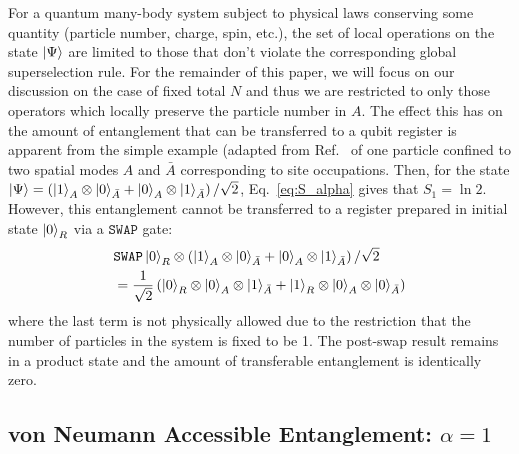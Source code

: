 For a quantum many-body system subject to physical laws conserving some quantity (particle number, charge, spin, etc.), the set of local operations on the state $\ket{\Psi}$ are limited to those that don't violate the corresponding global superselection rule.  For the remainder of this paper, we will focus on our discussion on the case of fixed total $N$ and thus we are restricted to only those operators which locally preserve the particle number in $A$.  The effect this has on the amount of entanglement that can be transferred to a qubit register is apparent from the simple example (adapted from Ref.~\cite{Wiseman:2003vn} of one particle confined to two spatial modes $A$ and $\bar{A}$ corresponding to site occupations.  Then, for the state $\ket{\Psi} = \left(\ket{1}_A \otimes \ket{0}_{\bar{A}} + \ket{0}_A \otimes \ket{1}_{\bar{A}} \right)/\sqrt{2}$, Eq.~\eqref{eq:S_alpha} gives that $S_1 = \ln 2$. However, this entanglement cannot be transferred to a register prepared in initial state $\ket{0}_R$ via a $\texttt{SWAP}$ gate:
\begin{align*}
    & \texttt{SWAP} \ket{0}_R\otimes\left(\ket{1}_A \otimes
    \ket{0}_{\bar{A}} + \ket{0}_A \otimes \ket{1}_{\bar{A}} \right)/\sqrt{2} \\
    &= \frac{1}{\sqrt{2}}\left( \ket{0}_R \otimes \ket{0}_A \otimes
        \ket{1}_{\bar{A}} + \ket{1}_R \otimes \ket{0}_A \otimes
    \ket{0}_{\bar{A}} \right)
\end{align*}
where the last term is not physically allowed due to the restriction that the number of particles in the system is fixed to be 1. The post-swap result remains in a product state and the amount of transferable entanglement is identically zero.

\subsection{von Neumann Accessible Entanglement: $\alpha = 1$}

